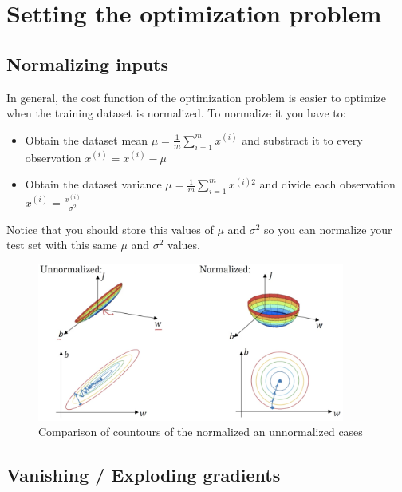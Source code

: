 \section*{Setting the optimization problem}
\subsection*{Normalizing inputs}

In general, the cost function of the optimization problem is easier to optimize when 
the training dataset is normalized. To normalize it you have to:
\begin{itemize}
    \item Obtain the dataset mean $\mu = \frac{1}{m}\sum_{i=1}^m x^{(i)}$ and substract 
    it to every observation $x^{(i)} = x^{(i)} - \mu$
    \item Obtain the dataset variance $\mu = \frac{1}{m}\sum_{i=1}^m x^{(i)2}$ and divide
    each observation $x^{(i)} = \frac{x^{(i)}}{\sigma^2}$
\end{itemize}
Notice that you should store this values of $\mu$ and $\sigma^2$ so you can normalize
your test set with this same $\mu$ and $\sigma^2$ values.
\begin{figure}[H]
    \begin{center}
            \includegraphics[width=0.9\textwidth]{img/normalized.png}
            \caption{Comparison of countours of the normalized an unnormalized cases}
        \end{center}
\end{figure}

\subsection*{Vanishing / Exploding gradients}





